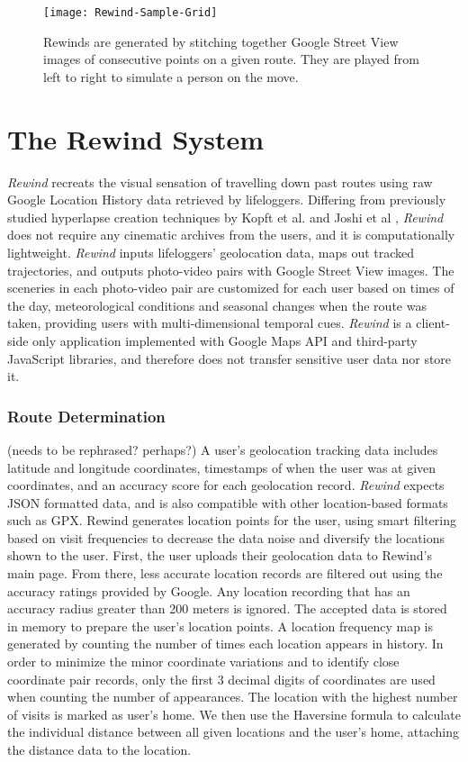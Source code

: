 \documentclass{sigchi}
\begin{document}
\begin{figure}[h]
   \centering
     \texttt{[image: Rewind-Sample-Grid]}
     \caption{Rewinds are generated by stitching together Google Street View images of consecutive points on a given route. They are played from left to right to simulate a person on the move.}
     \label{fig:rewinds}
\end{figure}

\section{The Rewind System}
\textit{Rewind} recreats the visual sensation of travelling down past routes using raw Google Location History data retrieved by lifeloggers. Differing from previously studied hyperlapse creation techniques by Kopft et al. and Joshi et al \cite{opf:2014:FHV:2601097.2601195, Joshi:2015:RHC:2809654.2766954}, \textit{Rewind} does not require any cinematic archives from the users, and it is computationally lightweight. \textit{Rewind} inputs lifeloggers' geolocation data, maps out tracked trajectories, and outputs photo-video pairs with Google Street View images. The sceneries in each photo-video pair are customized for each user based on times of the day, meteorological conditions and seasonal changes when the route was taken, providing users with multi-dimensional temporal cues. \textit{Rewind} is a client-side only application implemented with Google Maps API and third-party JavaScript libraries, and therefore does not transfer sensitive user data nor store it.

\subsubsection{Route Determination} (needs to be rephrased? perhaps?)
A user's geolocation tracking data includes latitude and longitude coordinates, timestamps of when the user was at given coordinates, and an accuracy score for each geolocation record. \textit{Rewind} expects JSON formatted data, and is also compatible with other location-based formats such as GPX. Rewind generates location points for the user, using smart filtering based on visit frequencies to decrease the data noise and diversify the locations shown to the user. First, the user uploads their geolocation data to Rewind's main page. From there, less accurate location records are filtered out using the accuracy ratings provided by Google. Any location recording that has an accuracy radius greater than 200 meters is ignored. The accepted data is stored in memory to prepare the user's location points. A location frequency map is generated by counting the number of times each location appears in history. In order to minimize the minor coordinate variations and to identify close coordinate pair records, only the first 3 decimal digits of coordinates are used when counting the number of appearances. The location with the highest number of visits is marked as user's home. We then use the Haversine formula to calculate the individual distance between all given locations and the user's home, attaching the distance data to the location.
\end{document}
